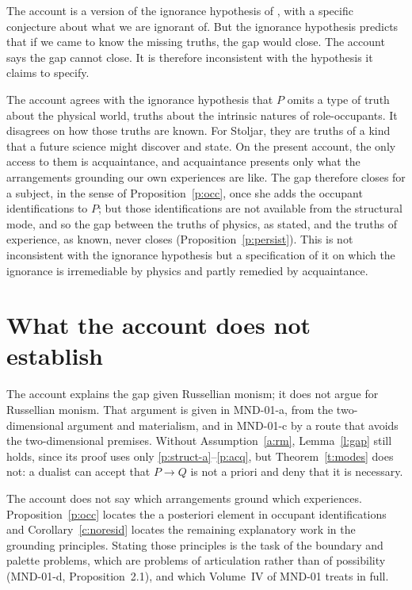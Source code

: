 \documentclass{situationist-preprint}
\begin{document}
\begin{objection}[Ignorance]\label{o:ignorance}
The account is a version of the ignorance hypothesis of \citet{Stoljar2006}, with a specific conjecture about what we are ignorant of. But the ignorance hypothesis predicts that if we came to know the missing truths, the gap would close. The account says the gap cannot close. It is therefore inconsistent with the hypothesis it claims to specify.
\end{objection}

\begin{reply}
The account agrees with the ignorance hypothesis that $P$ omits a type of truth about the physical world, truths about the intrinsic natures of role-occupants. It disagrees on how those truths are known. For Stoljar, they are truths of a kind that a future science might discover and state. On the present account, the only access to them is acquaintance, and acquaintance presents only what the arrangements grounding our own experiences are like. The gap therefore closes for a subject, in the sense of Proposition~\ref{p:occ}, once she adds the occupant identifications to $P$; but those identifications are not available from the structural mode, and so the gap between the truths of physics, as stated, and the truths of experience, as known, never closes (Proposition~\ref{p:persist}). This is not inconsistent with the ignorance hypothesis but a specification of it on which the ignorance is irremediable by physics and partly remedied by acquaintance.
\end{reply}

\section{What the account does not establish}\label{s:not}

The account explains the gap given Russellian monism; it does not argue for Russellian monism. That argument is given in MND-01-a, from the two-dimensional argument and materialism, and in MND-01-c by a route that avoids the two-dimensional premises. Without Assumption~\ref{a:rm}, Lemma~\ref{l:gap} still holds, since its proof uses only \ref{p:struct-a}--\ref{p:acq}, but Theorem~\ref{t:modes} does not: a dualist can accept that $P \to Q$ is not a priori and deny that it is necessary.

The account does not say which arrangements ground which experiences. Proposition~\ref{p:occ} locates the a posteriori element in occupant identifications and Corollary~\ref{c:noresid} locates the remaining explanatory work in the grounding principles. Stating those principles is the task of the boundary and palette problems, which are problems of articulation rather than of possibility (MND-01-d, Proposition~2.1), and which Volume~IV of MND-01 treats in full.
\end{document}
